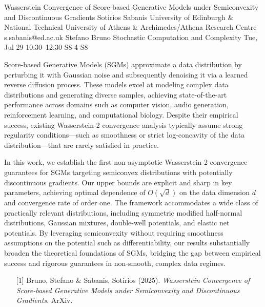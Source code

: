 \begin{talk}
  {Wasserstein Convergence of Score-based Generative Models under Semiconvexity and Discontinuous Gradients}%
  {Sotirios Sabanis}%
  {University of Edinburgh \& National Technical University of Athens \& Archimedes/Athena Research Centre}%
  {s.sabanis@ed.ac.uk}%
  {Stefano Bruno}%
  {Stochastic Computation and Complexity}%
  {Tue, Jul 29 10:30–12:30}%
  {S8-4}%
  {S8}%
				
			
\noindent Score-based Generative Models (SGMs) approximate a data distribution by perturbing it with Gaussian noise and subsequently denoising it via a learned reverse diffusion process. These models excel at modeling complex data distributions and generating diverse samples, achieving state-of-the-art performance across domains such as computer vision, audio generation, reinforcement learning, and computational biology. Despite their empirical success, existing Wasserstein-2 convergence analysis typically assume strong regularity conditions—such as smoothness or strict log-concavity of the data distribution—that are rarely satisfied in practice.
		
	\noindent	In this work, we establish the first non-asymptotic Wasserstein-2 convergence guarantees for SGMs targeting semiconvex distributions with potentially discontinuous gradients. Our upper bounds are explicit and sharp in key parameters, achieving optimal dependence of $O(\sqrt{d})$ on the data dimension $d$ and convergence rate of order one. The framework accommodates a wide class of practically relevant distributions, including symmetric modified half-normal distributions, Gaussian mixtures, double-well potentials, and elastic net potentials. By leveraging semiconvexity without requiring smoothness assumptions on the potential such as differentiability, our results substantially broaden the theoretical foundations of SGMs, bridging the gap between empirical success and rigorous guarantees in non-smooth, complex data regimes.

\medskip


\begin{enumerate}
	\item[{[1]}] Bruno, Stefano \& Sabanis, Sotirios (2025). {\it Wasserstein Convergence of Score-based Generative Models under Semiconvexity and Discontinuous Gradients}. ArXiv.
\end{enumerate}


\end{talk}

